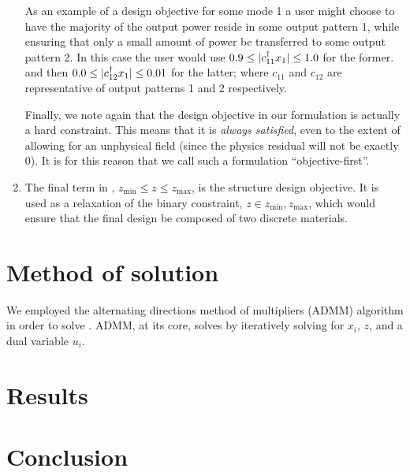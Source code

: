 \documentclass[letterpaper,10pt]{article}
\begin{document}
\begin{enumerate}
    As an example of a design objective for some mode 1 
        a user might choose to have the majority of the output power
        reside in some output pattern 1,
        while ensuring that only a small amount of power 
        be transferred to some output pattern 2.
    In this case the user would use 
        $0.9 \le |c_{11}^\dagger x_1| \le 1.0$ for the former.
        and then $0.0 \le |c_{12}^\dagger x_1| \le 0.01$ for the latter;
        where $c_{11}$ and $c_{12}$ are representative of 
        output patterns 1 and 2 respectively.
        
    Finally, we note again that the design objective in our formulation
        is actually a hard constraint.
    This means that it is \emph{always satisfied}, 
        even to the extent of allowing for an unphysical field 
        (since the physics residual will not be exactly 0).
    It is for this reason that we call such a formulation ``objective-first''.

\item 
    The final term in , $z_\text{min} \le z \le z_\text{max}$,
        is the structure design objective.
    It is used as a relaxation of the binary constraint,
        $z \in {z_\text{min}, z_\text{max}}$,
        which would ensure that the final design be composed 
        of two discrete materials.
\end{enumerate}

\section{Method of solution}
We employed the alternating directions method of multipliers (ADMM) algorithm %
    in order to solve .
ADMM, at its core, solves  by iteratively solving for 
    $x_i$, $z$, and a dual variable $u_i$.


\section{Results}

\section{Conclusion}
\end{document}
